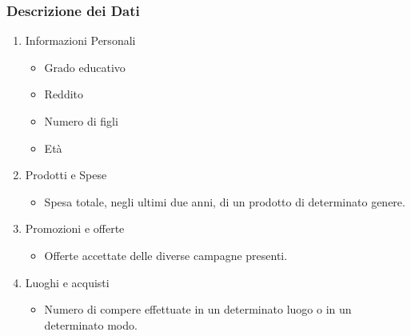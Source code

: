 \begin{frame}[fragile]
\frametitle{Descrizione dei Dati}
\begin{enumerate}
    \item Informazioni Personali
    \begin{itemize}
        \item Grado educativo
        \item Reddito
        \item Numero di figli
        \item Età
    \end{itemize}
    \item Prodotti e Spese
    \begin{itemize}
        \item Spesa totale, negli ultimi due anni, di un prodotto di determinato genere.
    \end{itemize}
    \item Promozioni e offerte
    \begin{itemize}
        \item Offerte accettate delle diverse campagne presenti.
    \end{itemize}
    \item Luoghi e acquisti
    \begin{itemize}
        \item Numero di compere effettuate in un determinato luogo o in un determinato modo.
    \end{itemize}
\end{enumerate}
\end{frame}



